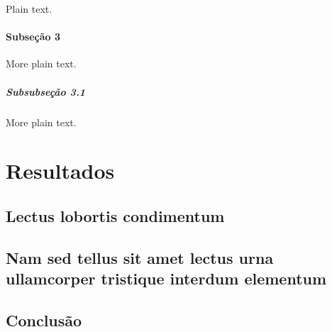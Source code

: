 \documentclass[12pt,openright,twoside,a4paper]{abntex2}
\begin{document}
Plain text.

\lipsum[11-15]

\subsection{Subseção 3}

More plain text.

\lipsum[16-17]

\subsubsection{Subsubseção 3.1}

More plain text.

\lipsum[18-20]

\part{Resultados}

\chapter{Lectus lobortis condimentum}

\lipsum[21-23]

\chapter{Nam sed tellus sit amet lectus urna ullamcorper tristique interdum
elementum}

\lipsum[24]




\chapter*{Conclusão}
\end{document}
